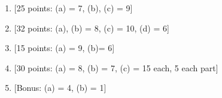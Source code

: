 \documentclass[11pt]{article}
\begin{document}
\newpage
\setcounter{page}{1}
\begin{enumerate}

\item {[25 points: (a) = 7, (b), (c) = 9]}
\vspace*{.5em}


\newpage
\item {[32 points: (a), (b) = 8, (c) = 10, (d) = 6]}
\vspace*{.5em}


\newpage
\item {[15 points: (a) = 9, (b)= 6]}
\vspace*{.5em}


\newpage
\item {[30 points: (a) = 8, (b) = 7, (c) = 15 each, 5 each part]}
\vspace*{.5em}

%

%
%
%
\newpage
\item {[Bonus: (a) = 4, (b) = 1]}
\vspace*{.5em}


\end{enumerate}
\end{document}
